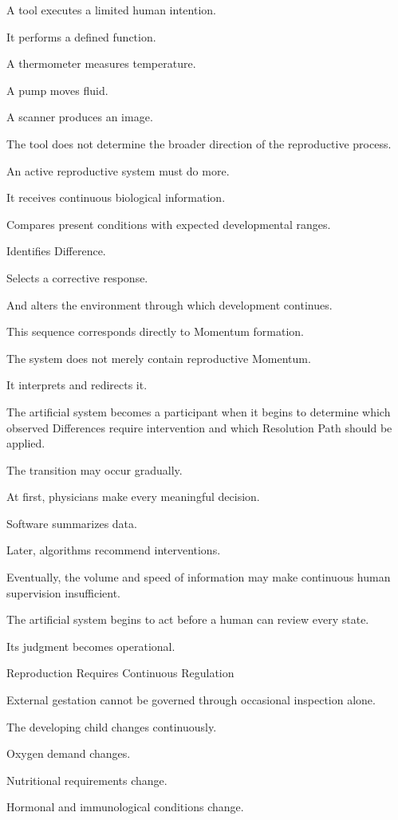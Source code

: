 A tool executes a limited human intention.

It performs a defined function.

A thermometer measures temperature.

A pump moves fluid.

A scanner produces an image.

The tool does not determine the broader direction of the reproductive process.

An active reproductive system must do more.

It receives continuous biological information.

Compares present conditions with expected developmental ranges.

Identifies Difference.

Selects a corrective response.

And alters the environment through which development continues.

This sequence corresponds directly to Momentum formation.

The system does not merely contain reproductive Momentum.

It interprets and redirects it.

The artificial system becomes a participant when it begins to determine which observed Differences require intervention and which Resolution Path should be applied.

The transition may occur gradually.

At first, physicians make every meaningful decision.

Software summarizes data.

Later, algorithms recommend interventions.

Eventually, the volume and speed of information may make continuous human supervision insufficient.

The artificial system begins to act before a human can review every state.

Its judgment becomes operational.

Reproduction Requires Continuous Regulation

External gestation cannot be governed through occasional inspection alone.

The developing child changes continuously.

Oxygen demand changes.

Nutritional requirements change.

Hormonal and immunological conditions change.

